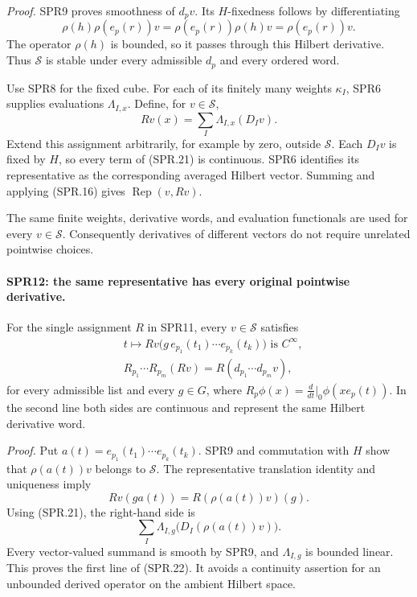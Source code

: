 \emph{Proof.}
SPR9 proves smoothness of \(d_pv\).  Its \(H\)-fixedness follows by
differentiating
\[
       \rho(h)\rho(e_p(r))v=\rho(e_p(r))\rho(h)v
                           =\rho(e_p(r))v.
\]
The operator \(\rho(h)\) is bounded, so it passes through this
Hilbert derivative.  Thus \(\mathcal S\) is stable under every
admissible \(d_p\) and every ordered word.

Use SPR8 for the fixed cube.  For each of its finitely many
weights \(\kappa_I\), SPR6 supplies evaluations
\(\Lambda_{I,x}\).  Define, for \(v\in\mathcal S\),
\[
                       Rv(x)=\sum_I\Lambda_{I,x}(D_Iv).
 \tag{SPR.21}
\]
Extend this assignment arbitrarily, for example by zero, outside
\(\mathcal S\).  Each \(D_Iv\) is fixed by \(H\), so every term
of (SPR.21) is continuous.
SPR6 identifies its representative as the corresponding averaged
Hilbert vector.  Summing and applying (SPR.16) gives
\(\operatorname{Rep}(v,Rv)\).

The same finite weights, derivative words, and evaluation
functionals are used for every \(v\in\mathcal S\).
Consequently derivatives of different vectors do not require
unrelated pointwise choices.

\paragraph{SPR12: the same representative has every original pointwise derivative.}
\label{claim:SPR12}
For the single assignment \(R\) in SPR11, every
\(v\in\mathcal S\) satisfies
\[
\begin{split}
 &t\longmapsto Rv\bigl(g\,e_{p_1}(t_1)\cdots e_{p_k}(t_k)\bigr)
                                  \text{ is }C^\infty,\\
 &R_{p_1}\cdots R_{p_m}(Rv)=R(d_{p_1}\cdots d_{p_m}v),
\end{split}
\tag{SPR.22}
\]
for every admissible list and every \(g\in G\), where
\(R_p\phi(x)=\frac{d}{dt}|_0\phi(xe_p(t))\).
In the second line both sides are continuous and represent the
same Hilbert derivative word.

\emph{Proof.}
Put \(a(t)=e_{p_1}(t_1)\cdots e_{p_k}(t_k)\).
SPR9 and commutation with \(H\) show that \(\rho(a(t))v\)
belongs to \(\mathcal S\).
The representative translation identity and uniqueness imply
\[
                     Rv(ga(t))=R(\rho(a(t))v)(g).
 \tag{SPR.23}
\]
Using (SPR.21), the right-hand side is
\[
             \sum_I\Lambda_{I,g}\bigl(D_I(\rho(a(t))v)\bigr).
\]
Every vector-valued summand is smooth by SPR9, and
\(\Lambda_{I,g}\) is bounded linear.  This proves the first line
of (SPR.22).  It avoids a continuity assertion for an unbounded
derived operator on the ambient Hilbert space.

